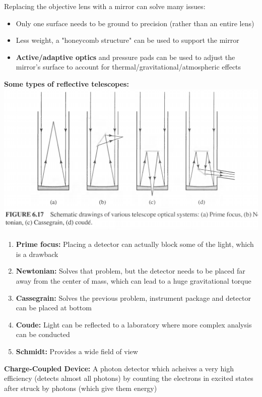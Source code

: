 \documentclass[12pt]{article}
\begin{document}
Replacing the objective lens with a mirror can solve many issues:
\begin{itemize}
    \item Only one surface needs to be ground to precision (rather than an entire lens)
    \item Less weight, a "honeycomb structure" can be used to support the mirror
    \item \textbf{Active/adaptive optics} and pressure pads can be used to adjust the mirror's surface to account for thermal/gravitational/atmospheric effects
\end{itemize}

\textbf{Some types of reflective telescopes:}
\newline
\includegraphics[scale=0.5]{Figures/Telescopes.png}
\begin{enumerate}[label=(\alph*)]
 \item \textbf{Prime focus:} Placing a detector can actually block some of the light, which is a drawback
 \item \textbf{Newtonian:} Solves that problem, but the detector needs to be placed far away from the center of mass, which can lead to a huge gravitational torque
 \item \textbf{Cassegrain:} Solves the previous problem, instrument package and detector can be placed at bottom
 \item \textbf{Coude:} Light can be reflected to a laboratory where more complex analysis can be conducted
 \item \textbf{Schmidt:} Provides a wide field of view
\end{enumerate}

\textbf{Charge-Coupled Device:} A photon detector which acheives a very high efficiency (detects almost all photons) by counting the electrons in excited states after struck by photons (which give them energy)
\end{document}
